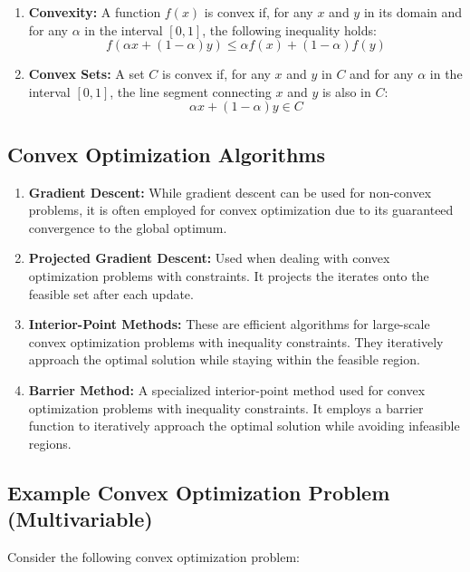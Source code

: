 \documentclass[a4paper]{article}
\begin{document}
\begin{enumerate}
\item \textbf{Convexity:} A function \(f(x)\) is convex if, for any \(x\) and \(y\) in its domain and for any \(\alpha\) in the interval \([0, 1]\), the following inequality holds:
\[
f(\alpha x + (1-\alpha)y) \leq \alpha f(x) + (1-\alpha) f(y)
\]

\item \textbf{Convex Sets:} A set \(C\) is convex if, for any \(x\) and \(y\) in \(C\) and for any \(\alpha\) in the interval \([0, 1]\), the line segment connecting \(x\) and \(y\) is also in \(C\):
\[
\alpha x + (1-\alpha)y \in C
\]
\end{enumerate}

\subsection{Convex Optimization Algorithms}

\begin{enumerate}
\item \textbf{Gradient Descent:} While gradient descent can be used for non-convex problems, it is often employed for convex optimization due to its guaranteed convergence to the global optimum.

\item \textbf{Projected Gradient Descent:} Used when dealing with convex optimization problems with constraints. It projects the iterates onto the feasible set after each update.

\item \textbf{Interior-Point Methods:} These are efficient algorithms for large-scale convex optimization problems with inequality constraints. They iteratively approach the optimal solution while staying within the feasible region.

\item \textbf{Barrier Method:} A specialized interior-point method used for convex optimization problems with inequality constraints. It employs a barrier function to iteratively approach the optimal solution while avoiding infeasible regions.
\end{enumerate}

\subsection{Example Convex Optimization Problem (Multivariable)}

Consider the following convex optimization problem:
\end{document}
